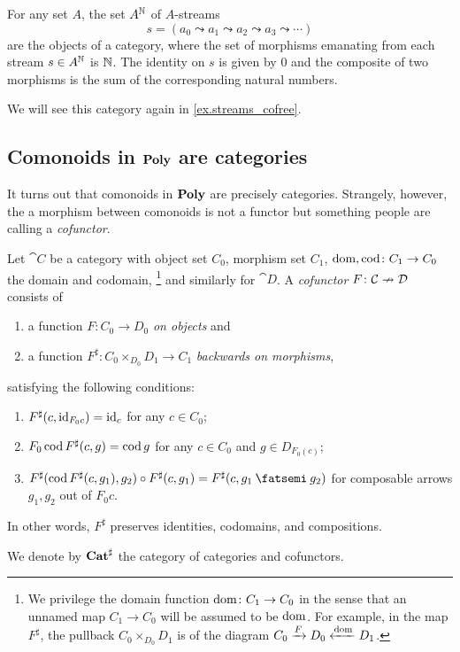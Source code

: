\documentclass[Book-Poly]{subfiles}
\begin{document}
\begin{example}\label{ex.streams_category}
For any set $A$, the set $A^{\mathbb{N}}$ of $A$-streams
\[
s=(a_0\leadsto a_1\leadsto a_2\leadsto a_3\leadsto\cdots)
\]
are the objects of a category, where the set of morphisms emanating from each stream $s\in A^{\mathbb{N}}$ is $\mathbb{N}$. The identity on $s$ is given by $0$ and the composite of two morphisms is the sum of the corresponding natural numbers.

We will see this category again in \cref{ex.streams_cofree}.
\end{example}

\subsection{Comonoids in $\mathbf{Poly}$ are categories}

It turns out that comonoids in $\mathbf{Poly}$ are precisely categories. Strangely, however, the a morphism between comonoids is not a functor but something people are calling a \emph{cofunctor}.

\begin{definition}[Cofunctor]\label{def.cofunctor}
Let $\cat{C}$ be a category with object set $C_0$, morphism set $C_1$, $\operatorname{dom},\operatorname{cod}\colon C_1\to C_0$ the domain and codomain,%
\footnote{We privilege the domain function $\operatorname{dom}\colon C_1\to C_0$ in the sense that an unnamed map $C_1\to C_0$ will be assumed to be $\operatorname{dom}$. For example, in the map $F^\sharp$, the pullback $C_0\times_{D_0}D_1$ is of the diagram $C_0\xrightarrow{F}D_0\xleftarrow{\operatorname{dom}}D_1$.}
 and similarly for $\cat{D}$. A \emph{cofunctor} $F\colon \mathcal{C}\nrightarrow \mathcal{D}$ consists of
\begin{enumerate}[itemsep=0pt]
  \item a function  $F\colon C_0\to D_0$ \emph{on objects} and
  \item a function $F^\sharp\colon C_0\times_{D_0}D_1\to C_1$ \emph{backwards on morphisms},
\end{enumerate}
satisfying the following conditions:
\begin{enumerate}[itemsep=0pt, label=\roman*.]
	\item $F^\sharp(c,\mathrm{id}_{F_0c})=\mathrm{id}_c$ for any $c\in C_0$;
	\item $F_0\operatorname{cod} F^\sharp(c,g)=\operatorname{cod} g$ for any $c\in C_0$ and $g\in D_{F_0(c)}$;
	\item $F^\sharp(\cod F^\sharp(c,g_1),g_2)\circ F^\sharp(c,g_1)=F^\sharp(c,g_1\then g_2)$ for composable arrows $g_1,g_2$ out of $F_0 c$.
\end{enumerate}
In other words, $F^\sharp$ preserves identities, codomains, and compositions.

We denote by $\mathbf{Cat}^\sharp$ the category of categories and cofunctors.
\end{definition}
\end{document}

